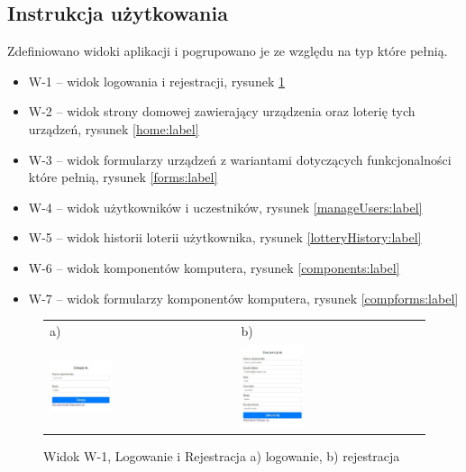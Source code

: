 \subsection{Instrukcja użytkowania}

Zdefiniowano widoki aplikacji i pogrupowano je ze względu na typ które pełnią.
\begin{itemize}
	\item W-1 -- widok logowania i rejestracji, rysunek \ref{authview:label}
	\item W-2 -- widok strony domowej zawierający urządzenia oraz loterię tych urządzeń, rysunek \ref{home:label}
	\item W-3 -- widok formularzy urządzeń z wariantami dotyczących funkcjonalności które pełnią, rysunek \ref{forms:label}
	\item W-4 -- widok użytkowników i uczestników, rysunek \ref{manageUsers:label}
	\item W-5 -- widok historii loterii użytkownika, rysunek \ref{lotteryHistory:label}
	\item W-6 -- widok komponentów komputera, rysunek \ref{components:label}
	\item W-7 -- widok formularzy komponentów komputera, rysunek \ref{compforms:label}
\end{itemize} 





\begin{figure}[htb]
  \centering
	\begin{tabular}{@{}ll@{}}
	a) & b) \\
  \includegraphics[width=0.35\textwidth]{rys05/view/login.pdf} & 
	\includegraphics[width=0.35\textwidth]{rys05/view/register.pdf}
	\end{tabular}
  \caption{Widok W-1, Logowanie i Rejestracja a) logowanie, b) rejestracja}
  \label{authview:label}
\end{figure}


